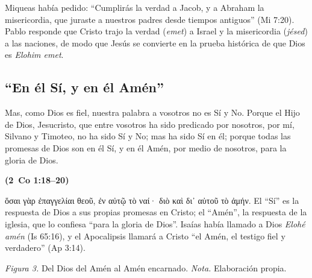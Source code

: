 \documentclass[11pt,letterpaper]{article}
\newcommand{\heb}[1]{\mbox{\foreignlanguage{hebrew}{#1}}}
\newcommand{\grc}[1]{\foreignlanguage{ancientgreek}{#1}}
\newcommand{\fuente}[1]{\par\hfill{\upshape\bfseries\small\textcolor{azul}{#1}}}
\begin{document}
Miqueas había pedido: ``Cumplirás la verdad a Jacob, y a Abraham la misericordia, que juraste a nuestros padres desde tiempos antiguos'' (Mi 7:20). Pablo responde que Cristo trajo la verdad (\emph{emet}) a Israel y la misericordia (\emph{jésed}) a las naciones, de modo que Jesús se convierte en la prueba histórica de que Dios es \emph{Elohim emet}.

\subsection{``En él Sí, y en él Amén''}
\begin{cita}Mas, como Dios es fiel, nuestra palabra a vosotros no es Sí y No. Porque el Hijo de Dios, Jesucristo, que entre vosotros ha sido predicado por nosotros, por mí, Silvano y Timoteo, no ha sido Sí y No; mas ha sido Sí en él; porque todas las promesas de Dios son en él Sí, y en él Amén, por medio de nosotros, para la gloria de Dios.\fuente{(2~Co 1:18--20)}\end{cita}

\grc{ὅσαι γὰρ ἐπαγγελίαι θεοῦ, ἐν αὐτῷ τὸ ναί· διὸ καὶ δι᾽ αὐτοῦ τὸ ἀμήν}. El ``Sí'' es la respuesta de Dios a sus propias promesas en Cristo; el ``Amén'', la respuesta de la iglesia, que lo confiesa ``para la gloria de Dios''. Isaías había llamado a Dios \emph{Elohé amén} (Is 65:16), y el Apocalipsis llamará a Cristo ``el Amén, el testigo fiel y verdadero'' (Ap 3:14).

\begin{center}
\par
{\footnotesize\color{gris}\textit{Figura 3.} Del Dios del Amén al Amén encarnado. \textit{Nota.} Elaboración propia.}
\end{center}
\end{document}
